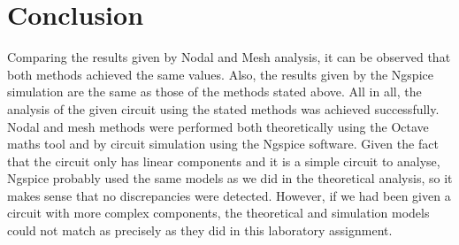 \section{Conclusion}
\label{sec:conclusion}
Comparing the results given by Nodal and Mesh analysis, it can be observed that both methods achieved the same values. Also, the results given by the Ngspice simulation are the same as those of the methods stated above.  
All in all, the analysis of the given circuit using the stated methods was achieved successfully. Nodal and mesh methods were performed both theoretically using the Octave maths tool and by circuit simulation using the Ngspice software. 
Given the fact that the circuit only has linear components and it is a simple circuit to analyse, Ngspice probably used the same models as we did in the theoretical analysis, so it makes sense that no discrepancies were detected. However, if we had been given a circuit with more complex components, the theoretical and simulation models could not match as precisely as they did in this laboratory assignment. 

